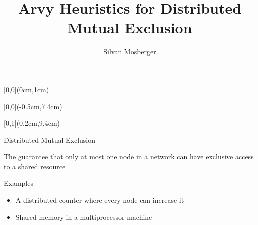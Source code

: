 \documentclass[12pt,hyperref={pdfpagelabels=false}]{beamer}
\title{Arvy Heuristics for Distributed Mutual Exclusion}
\author{Silvan Mosberger}
\institute{ETH Zurich -- Distributed Computing Group -- www.disco.ethz.ch}
\begin{document}
{
\begin{frame}
	\begin{textblock*}{\paperwidth}[0,0](0cm,1cm)
		\begin{center}
			\textbf{\huge \inserttitle}
		\end{center}
	\end{textblock*}
	\begin{textblock*}{\paperwidth}[0,0](-0.5cm,7.4cm)
		\flushright
		\color{white}
		\itshape \insertauthor
	\end{textblock*}
	\begin{textblock*}{\paperwidth}[0,1](0.2cm,9.4cm)
		\flushleft
		\tiny \itshape \insertinstitute
	\end{textblock*}
\end{frame}
}


\begin{frame}{Distributed Mutual Exclusion}

The guarantee that only at most one node in a network can have exclusive access to a shared resource

\begin{block}{Examples}
\begin{itemize}
\item A distributed counter where every node can increase it
\item Shared memory in a multiprocessor machine
\end{itemize}

\end{block}

\end{frame}
\end{document}

